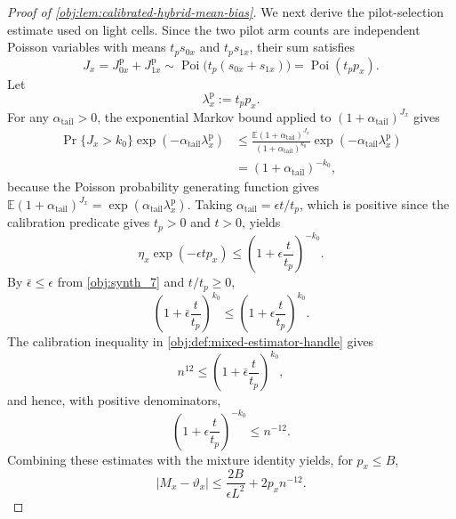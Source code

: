 \documentclass[11pt]{article}
\begin{document}
\begin{proof}[Proof of \cref{obj:lem:calibrated-hybrid-mean-bias}]
We next derive the pilot-selection estimate used on light cells. Since the two pilot arm counts are independent Poisson variables with means
\(t_p s_{0x}\) and \(t_p s_{1x}\), their sum satisfies
\[
J_x=J_{0x}^{\mathrm p}+J_{1x}^{\mathrm p}
\sim
\operatorname{Poi}\bigl(t_p(s_{0x}+s_{1x})\bigr)
=
\operatorname{Poi}(t_pp_x).
\]
Let
\[
\lambda_x^{\mathrm p}:=t_p p_x.
\]
For any
\(\alpha_{\mathrm{tail}}>0\), the exponential Markov bound applied to
\((1+\alpha_{\mathrm{tail}})^{J_x}\) gives
\[
\begin{aligned}
\Pr\{J_x>k_0\}\exp(-\alpha_{\mathrm{tail}}\lambda_x^{\mathrm p})
&\le
\frac{\mathbb E(1+\alpha_{\mathrm{tail}})^{J_x}}
     {(1+\alpha_{\mathrm{tail}})^{k_0}}
\exp(-\alpha_{\mathrm{tail}}\lambda_x^{\mathrm p}) \\
&=
\left(1+\alpha_{\mathrm{tail}}\right)^{-k_0},
\end{aligned}
\]
because the Poisson probability generating function gives
\(\mathbb E(1+\alpha_{\mathrm{tail}})^{J_x}
=\exp(\alpha_{\mathrm{tail}}\lambda_x^{\mathrm p})\).  Taking
\(\alpha_{\mathrm{tail}}=\epsilon t/t_p\), which is positive since the
calibration predicate gives \(t_p>0\) and \(t>0\), yields
\[
\eta_x\exp(-\epsilon t p_x)
\le
\left(1+\epsilon\frac{t}{t_p}\right)^{-k_0}.
\]
By \(\bar\epsilon\le\epsilon\) from \cref{obj:synth_7} and \(t/t_p\ge0\),
\[
\left(1+\bar\epsilon\frac{t}{t_p}\right)^{k_0}
\le
\left(1+\epsilon\frac{t}{t_p}\right)^{k_0}.
\]
The calibration inequality in \cref{obj:def:mixed-estimator-handle} gives
\[
n^{12}\le\left(1+\bar\epsilon\frac{t}{t_p}\right)^{k_0},
\]
and hence, with positive denominators,
\[
\left(1+\epsilon\frac{t}{t_p}\right)^{-k_0}
\le
n^{-12}.
\]
Combining these estimates with the mixture identity yields, for \(p_x\le B\),
\[
|M_x-\vartheta_x|
\le
\frac{2B}{\epsilon L^2}+2p_x n^{-12}.
\]


\end{proof}
\end{document}
